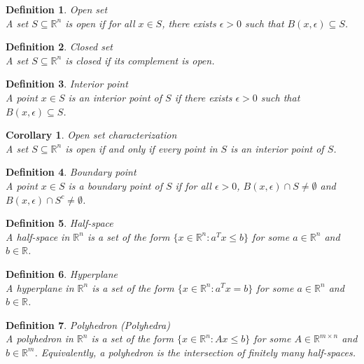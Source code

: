\documentclass[11pt]{book} %
\newtheorem{definition}{Definition}[section]
\newtheorem{corollary}{Corollary}[section]
\begin{document}
\begin{definition}{Open set} \\
A set $S \subseteq \mathbb{R}^n$ is open if for all $x \in S$, there exists $\epsilon > 0$ such that $B(x, \epsilon) \subseteq S$.
\end{definition}

\begin{definition}{Closed set} \\
A set $S \subseteq \mathbb{R}^n$ is closed if its complement is open.
\end{definition}

\begin{definition}{Interior point} \\
A point $x \in S$ is an interior point of $S$ if there exists $\epsilon > 0$ such that $B(x, \epsilon) \subseteq S$.
\end{definition}

\begin{corollary}{Open set characterization} \\
A set $S \subseteq \mathbb{R}^n$ is open if and only if every point in $S$ is an interior point of $S$.
\end{corollary}

\begin{definition}{Boundary point} \\
A point $x \in S$ is a boundary point of $S$ if for all $\epsilon > 0$, $B(x, \epsilon) \cap S \neq \emptyset$ and $B(x, \epsilon) \cap S^c \neq \emptyset$.
\end{definition}

\begin{definition}{Half-space} \\
A half-space in $\mathbb{R}^n$ is a set of the form $\{x \in \mathbb{R}^n : a^T x \leq b\}$ for some $a \in \mathbb{R}^n$ and $b \in \mathbb{R}$.
\end{definition}

\begin{definition}{Hyperplane} \\
A hyperplane in $\mathbb{R}^n$ is a set of the form $\{x \in \mathbb{R}^n : a^T x = b\}$ for some $a \in \mathbb{R}^n$ and $b \in \mathbb{R}$.
\end{definition}

\begin{definition}{Polyhedron (Polyhedra)} \\
A polyhedron in $\mathbb{R}^n$ is a set of the form $\{x \in \mathbb{R}^n : Ax \leq b\}$ for some $A \in \mathbb{R}^{m \times n}$ and $b \in \mathbb{R}^m$.
Equivalently, a polyhedron is the intersection of finitely many half-spaces.
\end{definition}
\end{document}
